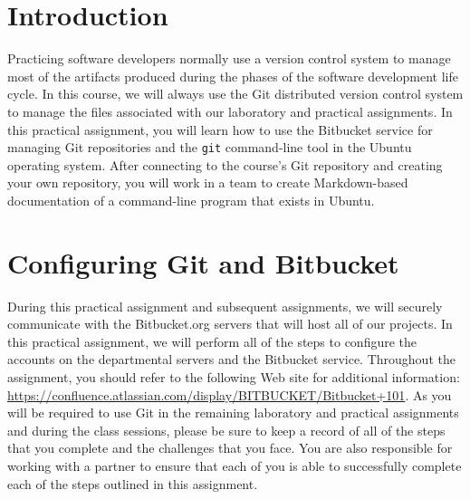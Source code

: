 

\usepackage[compact]{titlesec}



\section*{Introduction}

Practicing software developers normally use a version control system to manage most of the artifacts produced during the
phases of the software development life cycle.  In this course, we will always use the Git distributed version control
system to manage the files associated with our laboratory and practical assignments.  In this practical assignment, you
will learn how to use the Bitbucket service for managing Git repositories and the {\tt git} command-line tool in the
Ubuntu operating system. After connecting to the course's Git repository and creating your own repository, you will
work in a team to create Markdown-based documentation of a command-line program that exists in Ubuntu.

\section*{Configuring Git and Bitbucket}

During this practical assignment and subsequent assignments, we will securely communicate with the Bitbucket.org
servers that will host all of our projects.  In this practical assignment, we will perform all of the steps to configure
the accounts on the departmental servers and the Bitbucket service.  Throughout the assignment, you should refer to the
following Web site for additional information: \url{https://confluence.atlassian.com/display/BITBUCKET/Bitbucket+101}.
As you will be required to use Git in the remaining laboratory and practical assignments and during the class sessions,
please be sure to keep a record of all of the steps that you complete and the challenges that you face.  You are also
responsible for working with a partner to ensure that each of you is able to successfully complete each of the steps
outlined in this assignment.


